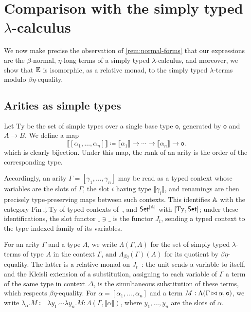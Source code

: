 \section{Comparison with the simply typed \texorpdfstring{$\lambda$}{lambda}-calculus}\label{sec:lambda}

We now make precise the observation of \cref{rem:normal-forms} that our expressions are the $\beta$-normal, $\eta$-long terms of a simply typed $\lambda$-calculus, and moreover, we show that $\mathbb{E}$ is isomorphic, as a relative monad, to the simply typed $\lambda$-terms modulo $\beta\eta$-equality.

\subsection{Arities as simple types}

Let $\mathrm{Ty}$ be the set of simple types over a single base type $\mathsf{o}$, generated by $\mathsf{o}$ and $A \to B$. We define a map
\[
\llbracket [\alpha_1, \ldots, \alpha_n] \rrbracket \coloneqq \llbracket \alpha_1 \rrbracket \to \cdots \to \llbracket \alpha_n \rrbracket \to \mathsf{o}.
\]
which is clearly bijection. Under this map, the rank of an arity is the order of the corresponding type.

Accordingly, an arity $\Gamma = [\gamma_1, \ldots, \gamma_n]$ may be read as a typed context whose variables are the slots of $\Gamma$, the slot $i$ having type $\llbracket \gamma_i \rrbracket$, and renamings are then precisely type-preserving maps between such contexts. This identifies $\mathbb{A}$ with the category $\mathrm{Fin}{\downarrow}\mathrm{Ty}$ of typed contexts of~\cite[Ex.~2.5]{AltenkirchChapmanUustalu2015}, and $\mathsf{Set}^{\left|\mathbb{A}\right|}$ with $[\mathrm{Ty}, \mathsf{Set}]$; under these identifications, the slot functor $\_ \ni \_$ is the functor $J_t$, sending a typed context to the type-indexed family of its variables.

For an arity $\Gamma$ and a type $A$, we write $\Lambda(\Gamma, A)$ for the set of simply typed $\lambda$-terms of type $A$ in the context $\Gamma$, and $\Lambda_{\beta\eta}(\Gamma)(A)$ for its quotient by $\beta\eta$-equality. The latter is a relative monad on $J_t$~\cite[Ex.~2.5]{AltenkirchChapmanUustalu2015}: the unit sends a variable to itself, and the Kleisli extension of a substitution, assigning to each variable of $\Gamma$ a term of the same type in context $\Delta$, is the simultaneous substitution of these terms, which respects $\beta\eta$-equality. For $\alpha = [\alpha_1, \ldots, \alpha_n]$ and a term $M : \Lambda(\Gamma \mathbin{\bowtie} \alpha, \mathsf{o})$, we write $\lambda_\alpha. M \coloneqq \lambda y_1. \cdots \lambda y_n. M : \Lambda(\Gamma, \llbracket \alpha \rrbracket)$, where $y_1, \ldots, y_n$ are the slots of $\alpha$.

